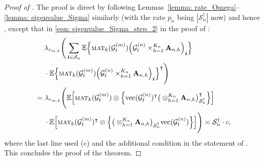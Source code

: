 \documentclass[aos]{imsart}
\theoremstyle{plain}
\theoremstyle{definition}
\def\mat{\textnormal{\textsc{mat}}}
\def\E{\mathbb{E}}
\def\cG{\mathcal{G}} \def\cH{\boldsymbol{\mathcal{H}}} \def\cI{\mathcal{I}}
\def\cS{\mathcal{S}}
\def\bi{\boldsymbol{i}}
\def\bA{\mathbf{A}}
\def\trans{\intercal}
\def\vec{\mathrm{vec}}
\newcommand{\ZC}[1]{\textcolor{teal}{ZC: #1}}
\begin{document}
\begin{proof}[Proof of ]
The proof is direct by following Lemmas~\ref{lemma: rate_Omega}--\ref{lemma: eigenvalue_Sigma} similarly (with the rate $p_n$ being $|\cS_n^\dagger|$ now) and hence , except that in \eqref{eqn: eigenvalue_Sigma_step_2} in the proof of :
\begin{align*}
    &\;\quad
    \lambda_{r_{m,k}}\Bigg( \sum_{\bi \in \cS_n} \E\Big\{ \mat_k(\cG_t^{(m)}) \Big( \cG_t^{(n)} \times_{h=1}^{K_n} \bA_{n,h} \Big)_{\bi} \Big\} \\
    &\;\quad
    \cdot \E\Big\{ \mat_k(\cG_t^{(m)}) \Big( \cG_t^{(n)} \times_{h=1}^{K_n} \bA_{n,h} \Big)_{\bi} \Big\}^\trans \Bigg) \notag \\
    &=
    \lambda_{r_{m,k}}\Bigg( \E\Big[ \mat_k(\cG_t^{(m)}) \otimes \Big\{ \vec(\cG_t^{(n)})^\trans \big( \otimes_{h=1}^{K_n} \bA_{n,h} \big)_{\cS_n^\dagger}^\trans \Big\} \Big] \notag \\
    &\;\quad
    \cdot \E\Big[ \mat_k(\cG_t^{(m)})^\trans \otimes \Big\{ \big( \otimes_{h=1}^{K_n} \bA_{n,h} \big)_{\cS_n^\dagger} \vec(\cG_t^{(n)}) \Big\} \Big] \Bigg) 
    \asymp
    \cS_n^\dagger \cdot c ,
\end{align*}
where the last line used (c) and the additional condition in the statement of . This concludes the proof of the theorem.
\end{proof}
\end{document}
